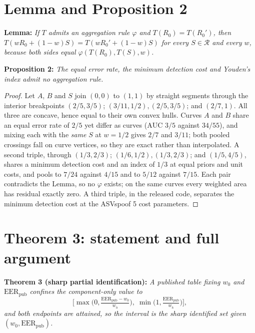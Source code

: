 \documentclass[10pt]{article}
\begin{document}
\section{Lemma and Proposition 2}

\vspace{2pt}\noindent\textbf{Lemma: } \emph{If $T$ admits an aggregation rule $\varphi$ and
$T(R_0)=T(R_0')$, then $T(wR_0+(1-w)S)=T(wR_0'+(1-w)S)$ for every $S\in\mathcal{R}$ and every $w$,
because both sides equal $\varphi(T(R_0),T(S),w)$.}

\vspace{2pt}\noindent\textbf{Proposition 2: } \emph{The equal error rate, the minimum detection
cost and Youden's index admit no aggregation rule.}

\begin{proof}
Let $A$, $B$ and $S$ join $(0,0)$ to $(1,1)$ by straight segments through the interior breakpoints
$(2/5,3/5)$; $(3/11,1/2),(2/5,3/5)$; and $(2/7,1)$. All
three are concave, hence equal to their own convex hulls. Curves $A$ and $B$ share an equal error
rate of $2/5$ yet differ as curves ($\mathrm{AUC}$ $3/5$ against $34/55$), and
mixing each with the \emph{same} $S$ at $w=1/2$ gives $2/7$ and $3/11$; both
pooled crossings fall on curve vertices, so they are exact rather than interpolated. A second
triple, through $(1/3,2/3)$; $(1/6,1/2),(1/3,2/3)$; and
$(1/5,4/5)$, shares a minimum detection cost and an index of $1/3$ at equal priors
and unit costs, and pools to $7/24$ against $4/15$ and to $5/12$ against
$7/15$. Each pair contradicts the Lemma, so no $\varphi$ exists; on the same curves every
weighted area has residual exactly zero. A third triple, in the released code, separates the minimum detection cost at the ASVspoof 5 cost parameters.
\end{proof}

\section{Theorem 3: statement and full argument}

\vspace{2pt}\noindent\textbf{Theorem 3 (sharp partial identification): } \emph{A published table
fixing $w_0$ and $\mathrm{EER}_{\text{pub}}$ confines the component-only value to}
\begin{equation}
\Big[\max\Big(0,\tfrac{\mathrm{EER}_{\text{pub}} - w_0}{w_{\mathrm{a}}}\Big),\;
      \min\Big(1,\tfrac{\mathrm{EER}_{\text{pub}}}{w_{\mathrm{a}}}\Big)\Big],
\label{eq:interval}
\end{equation}
\emph{and both endpoints are attained, so the interval is the sharp identified set given $(w_0,\mathrm{EER}_{\text{pub}})$.}
\end{document}
